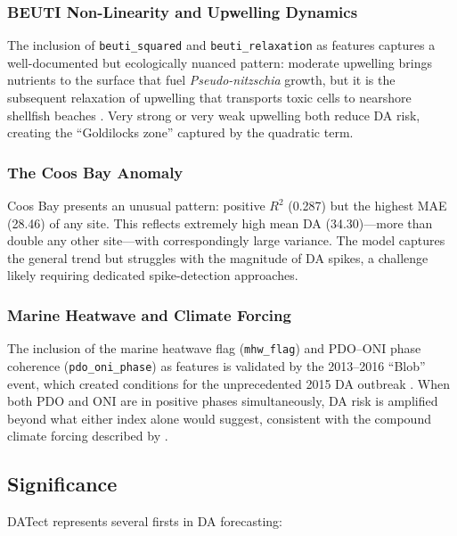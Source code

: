 \documentclass[preprint,12pt,authoryear]{elsarticle}
\begin{document}
\subsubsection{BEUTI Non-Linearity and Upwelling Dynamics}

The inclusion of \texttt{beuti\_squared} and \texttt{beuti\_relaxation} as features captures a well-documented but ecologically nuanced pattern: moderate upwelling brings nutrients to the surface that fuel \textit{Pseudo-nitzschia} growth, but it is the subsequent relaxation of upwelling that transports toxic cells to nearshore shellfish beaches \citep{Trainer2020, McKibben2017}. Very strong or very weak upwelling both reduce DA risk, creating the ``Goldilocks zone'' captured by the quadratic term.

\subsubsection{The Coos Bay Anomaly}

Coos Bay presents an unusual pattern: positive $R^2$ (0.287) but the highest MAE (\SI{28.46}{\microgrampeg}) of any site. This reflects extremely high mean DA (\SI{34.30}{\microgrampeg})---more than double any other site---with correspondingly large variance. The model captures the general trend but struggles with the magnitude of DA spikes, a challenge likely requiring dedicated spike-detection approaches.

\subsubsection{Marine Heatwave and Climate Forcing}

The inclusion of the marine heatwave flag (\texttt{mhw\_flag}) and PDO--ONI phase coherence (\texttt{pdo\_oni\_phase}) as features is validated by the 2013--2016 ``Blob'' event, which created conditions for the unprecedented 2015 DA outbreak \citep{Bond2015, McCabe2016, DiLorenzo2016}. When both PDO and ONI are in positive phases simultaneously, DA risk is amplified beyond what either index alone would suggest, consistent with the compound climate forcing described by \citet{McKibben2017}.

\subsection{Significance}
\label{sec:discussion-significance}

DATect represents several firsts in DA forecasting:
\end{document}
